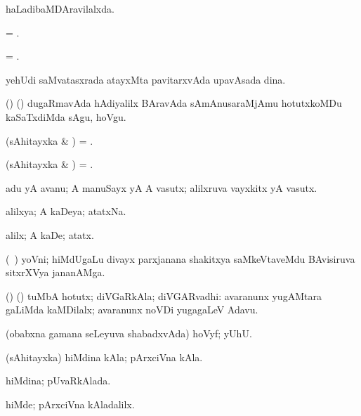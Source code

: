 \bentry
{} 
\gl{\gu} 
\bmng
haLadibaMDAravilalxda.
\emng
\eentry

\bentry
{} 
\gl{\nA} 
\bmng
= .
\emng
\eentry

\bentry
{}  
\gl{\gu} 
\bmng
= .
\emng
\eentry

\bentry
{} 
\gl{\nA} 
\bmng
yehUdi saMvatasxrada atayxMta pavitarxvAda upavAsada dina.
\emng
\eentry

\bentry
{} 
\gl{\akirx} 
\bmng
(\birx) (\ashi) dugaRmavAda hAdiyalilx BAravAda sAmAnusaraMjAmu hotutxkoMDu kaSaTxdiMda sAgu, hoVgu.
\emng
\eentry

\bentry
{} 
\gl{\gu} 
\bmng
(sAhitayxka \& \pArxM) = .
\emng
\eentry


\bentry
{} 
\gl{\kirxvi} 
\bmng
(sAhitayxka \& \pArxM) = .
\emng
\eentry

\bentry
{} 
\gl{\sanA} 
\bmng
adu yA avanu; A  manuSayx yA A vasutx; alilxruva vayxkitx yA vasutx.
\emng
\eentry

\bentry
{} 
\gl{\gu}  
\bmng
alilxya; A kaDeya; atatxNa.
\emng
\eentry

\bentry
{} 
\gl{\kirxvi} 
\bmng
alilx; A kaDe; atatx. 
\emng
\eentry

\bentry
{} 
\gl{\nA} 
\bmng
(\bava\ ) 
yoVni; hiMdUgaLu divayx parxjanana  shakitxya saMkeVtaveMdu BAvisiruva sitxrXVya jananAMga.
\emng
\eentry

\bentry
{} 
\gl{\nA} 
\bmng
(\bava) (\ashi) tuMbA hotutx; 
diVGaRkAla; diVGARvadhi:  avaranunx yugAMtara  gaLiMda kaMDilalx; avaranunx noVDi yugagaLeV Adavu.
\emng
\eentry

\bentry
{} 
\gl{\BAavayx} 
\bmng
(obabxna gamana seLeyuva shabadxvAda) hoVyf; yUhU.
\emng
\eentry

\bentry
{} 
\gl{\nA} 
\bmng
(sAhitayxka) hiMdina kAla; pArxciVna kAla.
\emng

\noindent
\gl{\pagu} 
\bmng
{}  
\banum
{} hiMdina; pUvaRkAlada. 

  hiMde; pArxciVna kAladalilx.
\eanum
\emng
\eentry


